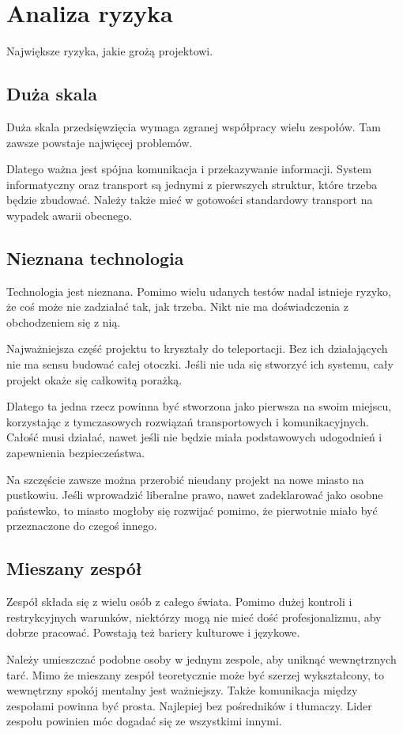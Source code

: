 \section{Analiza ryzyka}
Największe ryzyka, jakie grożą projektowi.
\subsection{Duża skala}
Duża skala przedsięwzięcia wymaga zgranej współpracy wielu zespołów. Tam zawsze powstaje najwięcej problemów. 

Dlatego ważna jest spójna komunikacja i przekazywanie informacji. System informatyczny oraz transport są jednymi z pierwszych struktur, które trzeba będzie zbudować.
Należy także mieć w gotowości standardowy transport na wypadek awarii obecnego.

\subsection{Nieznana technologia}
Technologia jest nieznana. Pomimo wielu udanych testów nadal istnieje ryzyko, że coś może nie zadziałać tak, jak trzeba. Nikt nie ma doświadczenia z obchodzeniem się z nią.

Najważniejsza część projektu to kryształy do teleportacji. Bez ich działających nie ma sensu budować całej otoczki.
Jeśli nie uda się stworzyć ich systemu, cały projekt okaże się całkowitą porażką.

Dlatego ta jedna rzecz powinna być stworzona jako pierwsza na swoim miejscu, korzystając z tymczasowych rozwiązań transportowych i komunikacyjnych.
Całość musi działać, nawet jeśli nie będzie miała podstawowych udogodnień i zapewnienia bezpieczeństwa.

Na szczęście zawsze można przerobić nieudany projekt na nowe miasto na pustkowiu.
Jeśli wprowadzić liberalne prawo, nawet zadeklarować jako osobne państewko, to miasto mogłoby się rozwijać pomimo, że pierwotnie miało być przeznaczone do czegoś innego.

\subsection{Mieszany zespół}
Zespół składa się z wielu osób z całego świata. Pomimo dużej kontroli i restrykcyjnych warunków, niektórzy mogą nie mieć dość profesjonalizmu, aby dobrze pracować. Powstają też bariery kulturowe i językowe. 

Należy umieszczać podobne osoby w jednym zespole, aby uniknąć wewnętrznych tarć. Mimo że mieszany zespół teoretycznie może być szerzej wykształcony, to wewnętrzny spokój mentalny jest ważniejszy.
Także komunikacja między zespołami powinna być prosta. Najlepiej bez pośredników i tłumaczy. Lider zespołu powinien móc dogadać się ze wszystkimi innymi.

